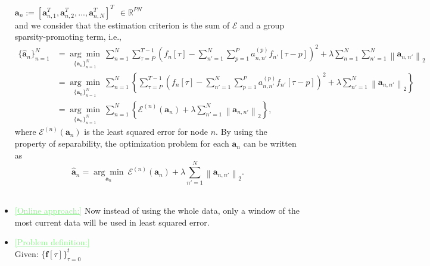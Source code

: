 \documentclass[11pt,final,onecolumn]{IEEEtran}
\newcommand{\cmt}[1]{\noindent\textcolor{lightgreen}{\underline{[#1]}}} %
\newcommand{\cmt}[1]{} %
\begin{document}
\begin{itemize}
$\bm a_{n}:=[\bm a_{n,1}^T,\bm a_{n,2}^T,...,\bm a_{n,N}^T]^T ~~ \in \mathbb R^ {PN}$\\
and we consider that the estimation criterion is the sum of $\mathcal{E}$ and a group sparsity-promoting term, i.e., 
\begin{align}
\{ \hat{\bm a}_n\}_{n=1}^N&=\underset{ \{\bm a_n\}_{n=1}^N}{\arg\min} ~ \sum_{n=1}^{N}\sum_{\tau=P}^{T-1}\left ( f_n[\tau]-\sum_{n'=1}^{N}\sum_{p=1}^{P} a_{n,n'}^{(p)} f_{n'}[\tau-p]\right )^2+\lambda \sum_{n=1}^{N} \sum_{n'=1}^{N} \left \lVert \bm a_{n,n'}\right\rVert_2\\ 
&=\underset{ \{\bm a_n\}_{n=1}^N}{\arg\min} ~ \sum_{n=1}^{N} \left \{\sum_{\tau=P}^{T-1}\left ( f_n[\tau]-\sum_{n'=1}^{N}\sum_{p=1}^{P} a_{n,n'}^{(p)} f_{n'}[\tau-p]\right )^2+\lambda \sum_{n'=1}^{N} \left \lVert \bm a_{n,n'}\right\rVert_2 \right \}\\
&=\underset{ \{\bm a_n\}_{n=1}^N}{\arg\min} ~ \sum_{n=1}^{N} \left \{\mathcal{E}^{(n)}(\bm a_n)+\lambda \sum_{n'=1}^{N} \left \lVert \bm a_{n,n'}\right\rVert_2 \right \},
\end{align}
where $\mathcal{E}^{(n)}(\bm a_n)$ is the least squared error for node $n$.
By using the property of separability, the optimization problem for each $\bm a_n$ can be written as
\begin{equation}
\hat{\bm a}_n=  \underset{ \bm a_n}{\arg\min} ~\mathcal{E}^{(n)}(\bm a_n)+\lambda \sum_{n'=1}^{N} \left \lVert \bm a_{n,n'}\right\rVert_2 .
\end{equation}
\\
\item \cmt{Online approach:} Now instead of using the whole data, only a window of the most current data will be used in least squared error. 
\item \cmt {Problem definition:}\\
Given: $\{\bm f[\tau]\}_{\tau =0}^{t}$


\end{itemize}
\end{document}
